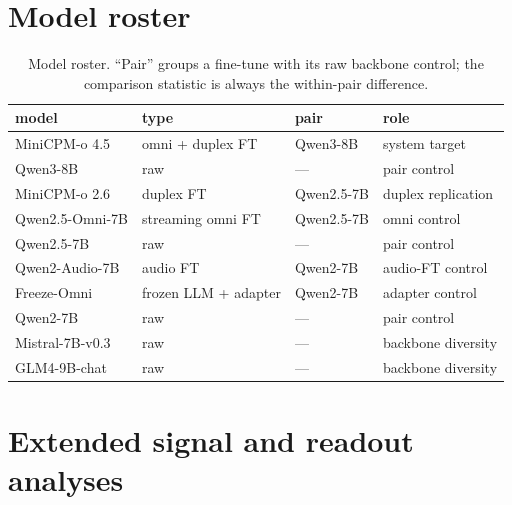 
\section{Model roster}
\label{app:models}

\begin{table}[h]
\centering\small
\caption{Model roster. ``Pair'' groups a fine-tune with its raw backbone
control; the comparison statistic is always the within-pair difference.}
\label{tab:models}
\begin{tabular}{llll}
\toprule
model & type & pair & role \\
\midrule
MiniCPM-o 4.5 & omni + duplex FT & Qwen3-8B & system target \\
Qwen3-8B & raw & --- & pair control \\
MiniCPM-o 2.6 & duplex FT & Qwen2.5-7B & duplex replication \\
Qwen2.5-Omni-7B & streaming omni FT & Qwen2.5-7B & omni control \\
Qwen2.5-7B & raw & --- & pair control \\
Qwen2-Audio-7B & audio FT & Qwen2-7B & audio-FT control \\
Freeze-Omni & frozen LLM + adapter & Qwen2-7B & adapter control \\
Qwen2-7B & raw & --- & pair control \\
Mistral-7B-v0.3 & raw & --- & backbone diversity \\
GLM4-9B-chat & raw & --- & backbone diversity \\
\bottomrule
\end{tabular}
\end{table}

\section{Extended signal and readout analyses}
\label{app:signal}

